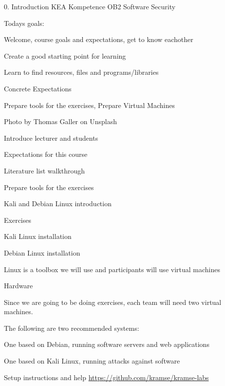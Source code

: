 \documentclass[Screen16to9,17pt]{foils}
\begin{document}
\mytitlepage
{0. Introduction}
{KEA Kompetence OB2 Software Security}

\hlkprofiluk



Todays goals:
\begin{list2}
\item Welcome, course goals and expectations, get to know eachother
\item Create a good starting point for learning
\item Learn to find resources, files and programs/libraries
\item Concrete Expectations
\item Prepare tools for the exercises, Prepare Virtual Machines
\end{list2}

  Photo by Thomas Galler on Unsplash


\begin{list2}
\item Introduce lecturer and students
\item Expectations for this course
\item Literature list walkthrough
\item Prepare tools for the exercises
\item Kali and Debian Linux introduction
\end{list2}

Exercises
\begin{list2}
\item Kali Linux installation
\item Debian Linux installation
\end{list2}
Linux is a toolbox we will use and participants will use virtual machines



Hardware

Since we are going to be doing exercises, each team will need two virtual machines.

The following are two recommended systems:
\begin{list2}
\item One based on Debian, running software servers and web applications
\item One based on Kali Linux, running attacks against software
\item Setup instructions and help \url{https://github.com/kramse/kramse-labs}
\end{list2}
\end{document}
